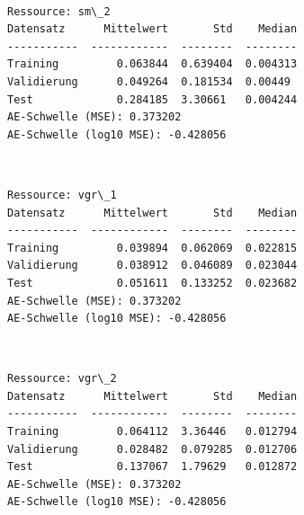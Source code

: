 \documentclass[11pt]{article}
\begin{document}
    \begin{center}
    \end{center}
    { \hspace*{\fill} \\}
    
    \begin{Verbatim}[commandchars=\\\{\}]
Ressource: sm\_2
Datensatz      Mittelwert       Std    Median
-----------  ------------  --------  --------
Training         0.063844  0.639404  0.004313
Validierung      0.049264  0.181534  0.00449
Test             0.284185  3.30661   0.004244
AE-Schwelle (MSE): 0.373202
AE-Schwelle (log10 MSE): -0.428056

    \end{Verbatim}

    \begin{center}
    \end{center}
    { \hspace*{\fill} \\}
    
    \begin{Verbatim}[commandchars=\\\{\}]
Ressource: vgr\_1
Datensatz      Mittelwert       Std    Median
-----------  ------------  --------  --------
Training         0.039894  0.062069  0.022815
Validierung      0.038912  0.046089  0.023044
Test             0.051611  0.133252  0.023682
AE-Schwelle (MSE): 0.373202
AE-Schwelle (log10 MSE): -0.428056

    \end{Verbatim}

    \begin{center}
    \end{center}
    { \hspace*{\fill} \\}
    
    \begin{Verbatim}[commandchars=\\\{\}]
Ressource: vgr\_2
Datensatz      Mittelwert       Std    Median
-----------  ------------  --------  --------
Training         0.064112  3.36446   0.012794
Validierung      0.028482  0.079285  0.012706
Test             0.137067  1.79629   0.012872
AE-Schwelle (MSE): 0.373202
AE-Schwelle (log10 MSE): -0.428056

    \end{Verbatim}
\end{document}
